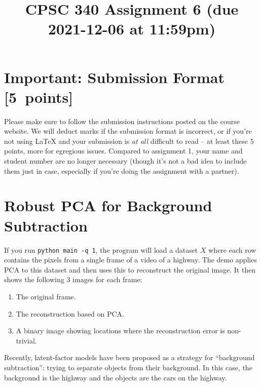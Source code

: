 \documentclass{article}
\newcommand{\blu}[1]{{\textcolor{blu}{#1}}}
\let\ask\blu
\newcommand\pts[1]{\textcolor{pointscolour}{[#1~points]}}
\begin{document}
\title{CPSC 340 Assignment 6 (due 2021-12-06 at 11:59pm)}
\date{}
\maketitle

\vspace{-7em}



\section*{Important: Submission Format \pts{5}}

Please make sure to follow the submission instructions posted on the course website.
\ask{We will deduct marks if the submission format is incorrect, or if you're not using \LaTeX{} and your submission is \emph{at all} difficult to read} -- at least these 5 points, more for egregious issues.
Compared to assignment 1, your name and student number are no longer necessary (though it's not a bad idea to include them just in case, especially if you're doing the assignment with a partner).

\vspace{1em}

\section{Robust PCA for Background Subtraction}

If you run \verb|python main -q 1|, the program will load a dataset $X$ where each row contains the pixels from a single frame of a video of a highway. The demo applies PCA to this dataset and then uses this to reconstruct the original image.
It then shows the following 3 images for each frame:
\begin{enumerate}
	\item The original frame.
	\item The reconstruction based on PCA.
	\item A binary image showing locations where the reconstruction error is non-trivial.
\end{enumerate}
Recently, latent-factor models have been proposed as a strategy for ``background subtraction'': trying to separate objects from their background. In this case, the background is the highway and the objects are the cars on the highway.
\end{document}
